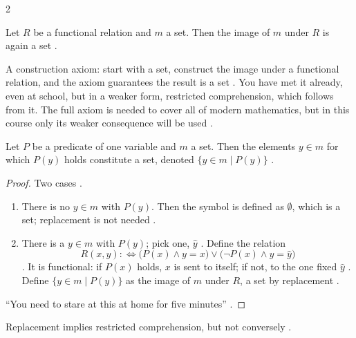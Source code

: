 \begin{paracol}{2}
\begin{definition}\label{ax:se-replacement}
Let $R$ be a functional relation and $m$ a set. Then the image of $m$ under $R$ is again a set
.
\end{definition}
A construction axiom: start with a set, construct the image under a functional relation, and the axiom guarantees
the result is a set . You have met it already, even at school, but in a weaker form,
restricted comprehension, which follows from it. The full axiom is needed to cover all of modern mathematics, but
in this course only its weaker consequence will be used .

\begin{theorem}\label{thm:se-comprehension}
Let $P$ be a predicate of one variable and $m$ a set. Then the elements $y\in m$ for which $P(y)$ holds constitute a
set, denoted $\{y\in m\mid P(y)\}$ .
\end{theorem}
\begin{proof}
Two cases .
\begin{enumerate}
  \item There is no $y\in m$ with $P(y)$. Then the symbol is defined as $\emptyset$, which is a set; replacement is not
        needed .
  \item There is a $y\in m$ with $P(y)$; pick one, $\hat y$ . Define the relation
        \[
          R(x,y):\Leftrightarrow\bigl(P(x)\wedge y=x\bigr)\vee\bigl(\neg P(x)\wedge y=\hat y\bigr)
        \]
        . It is functional: if $P(x)$ holds, $x$ is sent to itself;
        if not, to the one fixed $\hat y$ . Define $\{y\in m\mid P(y)\}$ as the image of
        $m$ under $R$, a set by replacement .
\end{enumerate}
``You need to stare at this at home for five minutes'' .
\end{proof}
Replacement implies restricted comprehension, but not conversely .


\end{paracol}
